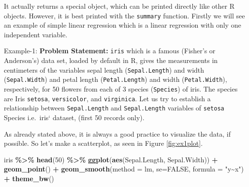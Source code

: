 \documentclass[
]{book}
\newenvironment{Shaded}{\begin{snugshade}}{\end{snugshade}}
\newcommand{\AttributeTok}[1]{\textcolor[rgb]{0.13,0.29,0.53}{#1}}
\newcommand{\ConstantTok}[1]{\textcolor[rgb]{0.56,0.35,0.01}{#1}}
\newcommand{\DecValTok}[1]{\textcolor[rgb]{0.00,0.00,0.81}{#1}}
\newcommand{\FunctionTok}[1]{\textcolor[rgb]{0.13,0.29,0.53}{\textbf{#1}}}
\newcommand{\NormalTok}[1]{#1}
\newcommand{\SpecialCharTok}[1]{\textcolor[rgb]{0.81,0.36,0.00}{\textbf{#1}}}
\newcommand{\StringTok}[1]{\textcolor[rgb]{0.31,0.60,0.02}{#1}}
\begin{document}
It actually returns a special object, which can be printed directly like other R objects. However, it is best printed with the \texttt{summary} function. Firstly we will see an example of simple linear regression which is a linear regression with only one independent variable.

Example-1: \textbf{Problem Statement:} \texttt{iris} which is a famous (Fisher's or Anderson's) data set, loaded by default in R, gives the measurements in centimeters of the variables sepal length (\texttt{Sepal.Length}) and width (\texttt{Sepal.Width}) and petal length (\texttt{Petal.Length}) and width (\texttt{Petal.Width}), respectively, for 50 flowers from each of 3 species (\texttt{Species}) of iris. The species are Iris \texttt{setosa}, \texttt{versicolor}, and \texttt{virginica}. Let us try to establish a relationship between \texttt{Sepal.Length} and \texttt{Sepal.Length} variables of \texttt{setosa} Species i.e.~iris` dataset, (first 50 records only).

As already stated above, it is always a good practice to visualize the data, if possible. So let's make a scatterplot, as seen in Figure \ref{fig:ex1plot}.

\begin{Shaded}
\begin{Highlighting}[]
\NormalTok{iris }\SpecialCharTok{\%\textgreater{}\%} 
  \FunctionTok{head}\NormalTok{(}\DecValTok{50}\NormalTok{) }\SpecialCharTok{\%\textgreater{}\%} 
  \FunctionTok{ggplot}\NormalTok{(}\FunctionTok{aes}\NormalTok{(Sepal.Length, Sepal.Width)) }\SpecialCharTok{+}
  \FunctionTok{geom\_point}\NormalTok{() }\SpecialCharTok{+}
  \FunctionTok{geom\_smooth}\NormalTok{(}\AttributeTok{method =} \StringTok{\textquotesingle{}lm\textquotesingle{}}\NormalTok{, }\AttributeTok{se=}\ConstantTok{FALSE}\NormalTok{, }\AttributeTok{formula =} \StringTok{"y\textasciitilde{}x"}\NormalTok{) }\SpecialCharTok{+}
  \FunctionTok{theme\_bw}\NormalTok{()}
\end{Highlighting}
\end{Shaded}
\end{document}
